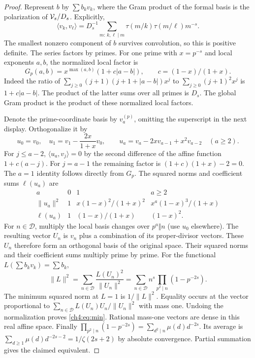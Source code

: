 \documentclass[11pt,a4paper,oneside,openany]{report}
\theoremstyle{remark}\newtheorem{remark}[theorem]{Remark}
\numberwithin{equation}{section}
\begin{document}
\begin{proof}
Represent $b$ by $\sum b_k v_k$, where the Gram product of the formal basis is the polarization of $\mathcal V_s/D_s$. Explicitly,
\[
 \langle v_k,v_\ell\rangle
 =D_s^{-1}\sum_{m:\,k,\ell\mid m}\tau(m/k)\tau(m/\ell)m^{-s}.
\]
The smallest nonzero component of $b$ survives convolution, so this is positive definite. The series factors by primes. For one prime with $x=p^{-s}$ and local exponents $a,b$, the normalized local factor is
\[
 G_p(a,b)=x^{\max(a,b)}(1+c|a-b|),\qquad c=(1-x)/(1+x).
\]
Indeed the ratio of $\sum_{j\ge0}(j+1)(j+1+|a-b|)x^j$ to $\sum_{j\ge0}(j+1)^2x^j$ is $1+c|a-b|$. The product of the latter sums over all primes is $D_s$. The global Gram product is the product of these normalized local factors.

Denote the prime-coordinate basis by $v_a^{(p)}$, omitting the superscript in the next display. Orthogonalize it by
\[
 u_0=v_0,\quad u_1=v_1-\frac{2x}{1+x}v_0,\qquad
 u_a=v_a-2xv_{a-1}+x^2v_{a-2}\quad(a\ge2).
\]
For $j\le a-2$, $\langle u_a,v_j\rangle=0$ by the second difference of the affine function $1+c(a-j)$. For $j=a-1$ the remaining factor is $(1+c)(1+x)-2=0$. The $a=1$ identity follows directly from $G_p$. The squared norms and coefficient sums $\ell(u_a)$ are
\[
\begin{array}{c|ccc}
 a&0&1&a\ge2\\ \hline
 \|u_a\|^2&1&x(1-x)^2/(1+x)^2& x^a(1-x)^3/(1+x)\\[2pt]
 \ell(u_a)&1&(1-x)/(1+x)&(1-x)^2 .
\end{array}
\]
For $n\in\mathcal D$, multiply the local basis changes over $p^a\Vert n$ (use $u_0$ elsewhere). The resulting vector $U_n$ is $v_n$ plus a combination of its proper-divisor vectors. These $U_n$ therefore form an orthogonal basis of the original space. Their squared norms and their coefficient sums multiply prime by prime. For the functional $L(\sum b_kv_k)=\sum b_k$,
\[
 \|L\|^2=\sum_{n\in\mathcal D}\frac{L(U_n)^2}{\|U_n\|^2}
  =\sum_{n\in\mathcal D}n^s\prod_{p^2\mid n}(1-p^{-2s}).
\]
The minimum squared norm at $L=1$ is $1/\|L\|^2$. Equality occurs at the vector proportional to $\sum_{n\in\mathcal D}L(U_n)U_n/\|U_n\|^2$ with mass one. Undoing the normalization proves \eqref{ch4:eq:min}. Rational mass-one vectors are dense in this real affine space.
Finally $\prod_{p^2\mid n}(1-p^{-2s})=\sum_{d^2\mid n}\mu(d)d^{-2s}$. Its average is $\sum_{d\ge1}\mu(d)d^{-2s-2}=1/\zeta(2s+2)$ by absolute convergence. Partial summation gives the claimed equivalent.
\end{proof}
\end{document}
